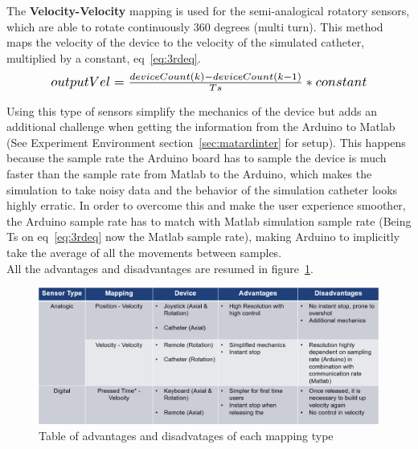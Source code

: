 The \textbf{Velocity-Velocity} mapping is used for the semi-analogical rotatory sensors, which are able to rotate continuously 360 degrees (multi turn). This method maps the velocity of the device to the velocity of the simulated catheter, multiplied by a constant, eq~\ref{eq:3rdeq}.\\

\begin{equation}
   \scalebox{1.2}{$outputVel=\frac{deviceCount(k)-deviceCount(k-1)}{Ts}*constant$}
   \centering
   \label{eq:3rdeq}
\end{equation}

Using this type of sensors simplify the mechanics of the device but adds an additional challenge when getting the information from the Arduino to Matlab (See Experiment Environment section~\ref{sec:matardinter} for setup). This happens because the sample rate the Arduino board has to sample the device is much faster than the sample rate from Matlab to the Arduino, which makes the simulation to take noisy data and the behavior of the simulation catheter looks highly erratic. In order to overcome this and make the user experience smoother, the Arduino sample rate has to match with Matlab simulation sample rate (Being Ts on eq~\ref{eq:3rdeq} now the Matlab sample rate), making Arduino to implicitly take the average of all the movements between samples.\\

All the advantages and disadvantages are resumed in figure~\ref{img:adtable}.\\

\begin{figure}[ht]
   \centering
   \includegraphics[width=1.0\textwidth]{img/adtable.PNG}
   \caption{Table of advantages and disadvatages of each mapping type}
   \label{img:adtable}
\end{figure}
